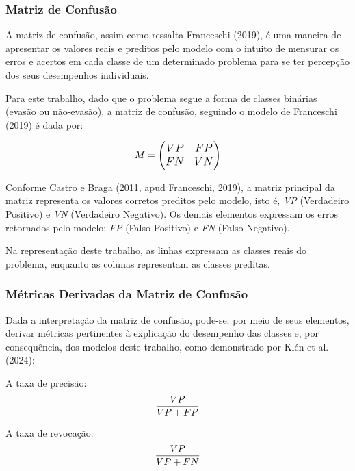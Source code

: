 \documentclass[english, spanish, brazilian]{RBIEarticle} %
\begin{document}
\subsubsection{Matriz de Confusão}
A matriz de confusão, assim como ressalta Franceschi (2019), é uma maneira de apresentar os valores reais e preditos pelo modelo com o intuito de mensurar os erros e acertos em cada classe de um determinado problema para se ter percepção dos seus desempenhos individuais.

Para este trabalho, dado que o problema segue a forma de classes binárias (evasão ou não-evasão), a matriz de confusão, seguindo o modelo de Franceschi (2019) é dada por:

\vspace{0.5cm}
\begin{equation}
\large
M = 
\begin{pmatrix}
VP & FP \\
FN & VN
\end{pmatrix}
\end{equation}
\vspace{0.5cm}

Conforme Castro e Braga (2011, apud Franceschi, 2019), a matriz principal da matriz representa os valores corretos preditos pelo modelo, isto é, \textit{VP} (Verdadeiro Positivo) e \textit{VN} (Verdadeiro Negativo). Os demais elementos expressam os erros retornados pelo modelo: \textit{FP} (Falso Positivo) e \textit{FN} (Falso Negativo).

Na representação deste trabalho, as linhas expressam as classes reais do problema, enquanto as colunas representam as classes preditas.

\subsubsection{Métricas Derivadas da Matriz de Confusão}
Dada a interpretação da matriz de confusão, pode-se, por meio de seus elementos, derivar métricas pertinentes à explicação do desempenho das classes e, por consequência, dos modelos deste trabalho, como demonstrado por Klén et al. (2024):

\vspace{0.5cm}
A taxa de precisão:
\begin{equation}
    \large \frac{VP}{VP+FP}
\end{equation}
\vspace{0.5cm}

\vspace{0.5cm}
A taxa de revocação:
\begin{equation}
    \large \frac{VP}{VP+FN}
\end{equation}
\vspace{0.5cm}
\end{document}
